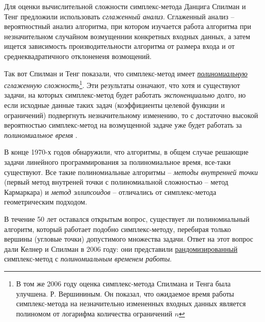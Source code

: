 \documentclass[%
	11pt,
	a4paper,
	utf8,
		]{article}
\begin{document}

Для оценки вычислительной сложности симплекс-метода Данцига Спилман и Тенг предложили использовать \emph{сглаженный анализ}. Сглаженный анализ -- вероятностный анализ алгоритма, при котором изучается работа алгоритма при незначительном случайном возмущеннии конкретных входных данных, а затем ищется зависимость производительности алгоритма от размера входа и от среднеквадратичного отклоненеия возмощений.

Так вот Спилман и Тенг показали, что симплекс-метод имеет \emph{\underline{полиномиальную} сглаженную сложность}\footnote{В том же 2006 году оценка симплекс-метода Спилмана и Тенга была улучшена. Р. Вершининым. Он показал, что ожидаемое время работы симплекс-метода на незначительно измененных входных данных является полиномом от логарифма количества ограничений $ n $}. Эти результаты означают, что хотя и существуют задачи, на которых симплекс-метод будет работать \emph{экспоненциально} долго, но если исходные данные таких задач (коэффициенты целевой функции и ограничений) подвергнуть незначительному изменению, то с достаточно высокой вероятностью симплекс-метод на возмущенной задаче уже будет работать за \emph{полиномиальное время} \cite[]{vorontsova:convex_opt-2021}.

В конце 1970-х годов обнаружили, что алгоритмы, в общем случае решающие задачи линейного программирования за полиномиальное время, все-таки существуют. Все такие полиномиальные алгоритмы -- \emph{методы внутренней точки} (первый метод внутреней точки с полиномиальной сложностью -- метод Кармаркара) и \emph{метод эллипсоидов} -- отличались от симплекс-метода геометрическим подходом.

В течение 50 лет оставался открытым вопрос, существует ли полиномиальный алгоритм, который работает подобно симплекс-методу, перебирая только вершины (угловые точки) допустимого множества задачи. Ответ на этот вопрос дали Келнер и Спилман в 2006 году: они представили \underline{рандомизированный} симплекс-метод с \emph{полиномиальным временем работы}.

\end{document}
